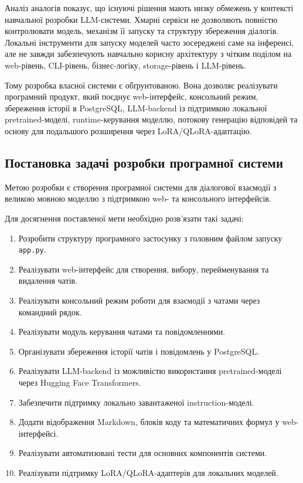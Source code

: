 Аналіз аналогів показує, що існуючі рішення мають низку обмежень у контексті навчальної розробки LLM-системи. Хмарні сервіси не дозволяють повністю контролювати модель, механізм її запуску та структуру збереження діалогів. Локальні інструменти для запуску моделей часто зосереджені саме на інференсі, але не завжди забезпечують навчально корисну архітектуру з чітким поділом на web-рівень, CLI-рівень, бізнес-логіку, storage-рівень і LLM-рівень.

Тому розробка власної системи є обґрунтованою. Вона дозволяє реалізувати програмний продукт, який поєднує web-інтерфейс, консольний режим, збереження історії в PostgreSQL, LLM-backend із підтримкою локальної pretrained-моделі, runtime-керування моделлю, потокову генерацію відповідей та основу для подальшого розширення через LoRA/QLoRA-адаптацію.

\subsection{Постановка задачі розробки програмної системи}

Метою розробки є створення програмної системи для діалогової взаємодії з великою мовною моделлю з підтримкою web- та консольного інтерфейсів.

Для досягнення поставленої мети необхідно розв'язати такі задачі:
\begin{enumerate}
  \item Розробити структуру програмного застосунку з головним файлом запуску \texttt{app.py}.
  \item Реалізувати web-інтерфейс для створення, вибору, перейменування та видалення чатів.
  \item Реалізувати консольний режим роботи для взаємодії з чатами через командний рядок.
  \item Реалізувати модуль керування чатами та повідомленнями.
  \item Організувати збереження історії чатів і повідомлень у PostgreSQL.
  \item Реалізувати LLM-backend із можливістю використання pretrained-моделі через Hugging Face Transformers.
  \item Забезпечити підтримку локально завантаженої instruction-моделі.
  \item Додати відображення Markdown, блоків коду та математичних формул у web-інтерфейсі.
  \item Реалізувати автоматизовані тести для основних компонентів системи.
  \item Реалізувати підтримку LoRA/QLoRA-адаптерів для локальних моделей.
\end{enumerate}

\newpage

